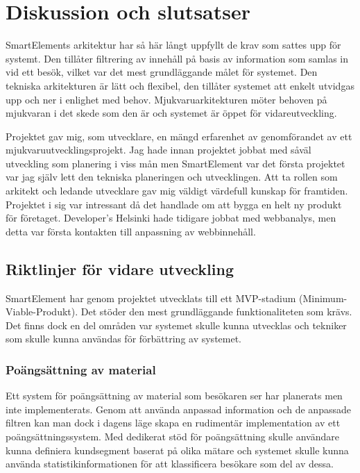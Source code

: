 \section{Diskussion och slutsatser}

SmartElements arkitektur har så här långt uppfyllt de krav som sattes upp för systemt. Den tillåter filtrering av innehåll på basis av information som samlas in vid ett besök, vilket var det mest grundläggande målet för systemet. Den tekniska arkitekturen är lätt och flexibel, den tillåter systemet att enkelt utvidgas upp och ner i enlighet med behov. Mjukvaruarkitekturen möter behoven på mjukvaran i det skede som den är och systemet är öppet för vidareutveckling.

Projektet gav mig, som utvecklare, en mängd erfarenhet av genomförandet av ett mjukvaruutvecklingsprojekt. Jag hade innan projektet jobbat med såväl utveckling som planering i viss mån men SmartElement var det första projektet var jag själv lett den tekniska planeringen och utvecklingen. Att ta rollen som arkitekt och ledande utvecklare gav mig väldigt värdefull kunskap för framtiden. Projektet i sig var intressant då det handlade om att bygga en helt ny produkt för företaget. Developer's Helsinki hade tidigare jobbat med webbanalys, men detta var första kontakten till anpassning av webbinnehåll.

\subsection{Riktlinjer för vidare utveckling}

SmartElement har genom projektet utvecklats till ett MVP-stadium (Minimum-Viable-Produkt). Det stöder den mest grundläggande funktionaliteten som krävs. Det finns dock en del områden var systemet skulle kunna utvecklas och tekniker som skulle kunna användas för förbättring av systemet.

\subsubsection{Poängsättning av material}

Ett system för poängsättning av material som besökaren ser har planerats men inte implementerats. Genom att använda anpassad information och de anpassade filtren kan man dock i dagens läge skapa en rudimentär implementation av ett poängsättningssystem. Med dedikerat stöd för poängsättning skulle användare kunna definiera kundsegment baserat på olika mätare och systemet skulle kunna använda statistikinformationen för att klassificera besökare som del av dessa.


